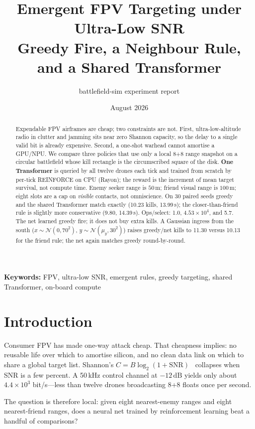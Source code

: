 \documentclass[12pt,a4paper]{article}
\title{\textbf{Emergent FPV Targeting under Ultra-Low SNR}\\[0.35em]
\large Greedy Fire, a Neighbour Rule, and a Shared Transformer}
\author{battlefield-sim experiment report}
\date{August 2026}
\begin{document}
\maketitle

\begin{abstract}
Expendable FPV airframes are cheap; two constraints are not. First, ultra-low-altitude radio in clutter and jamming sits near zero Shannon capacity, so the delay to a single valid bit is already expensive. Second, a one-shot warhead cannot amortise a GPU/NPU. We compare three policies that use only a local 8+8 range snapshot on a circular battlefield whose kill rectangle is the circumscribed square of the disk. \textbf{One Transformer} is queried by all twelve drones each tick and trained from scratch by per-tick REINFORCE on CPU (Rayon); the reward is the increment of mean target survival, not compute time. Enemy seeker range is $50\,\mathrm{m}$; friend visual range is $100\,\mathrm{m}$; eight slots are a cap on \emph{visible} contacts, not omniscience. On 30 paired seeds greedy and the shared Transformer match exactly (10.23 kills, 13.99\,s); the closer-than-friend rule is slightly more conservative (9.80, 14.39\,s). Ops/select: 1.0, $4.53\times 10^4$, and 5.7. The net learned greedy fire; it does not buy extra kills. A Gaussian ingress from the south ($x\sim\mathcal N(0,70^2)$, $y\sim\mathcal N(\mu_y,30^2)$) raises greedy/net kills to 11.30 versus 10.13 for the friend rule; the net again matches greedy round-by-round.
\end{abstract}

\noindent\textbf{Keywords:} FPV, ultra-low SNR, emergent rules, greedy targeting, shared Transformer, on-board compute

\section{Introduction}

Consumer FPV has made one-way attack cheap. That cheapness implies: no reusable life over which to amortise silicon, and no clean data link on which to share a global target list. Shannon's $C=B\log_2(1+\mathrm{SNR})$~\cite{shannon1948,sklar2001} collapses when SNR is a few percent. A 50\,kHz control channel at $-12\,\mathrm{dB}$ yields only about $4.4\times 10^3$ bit/s---less than twelve drones broadcasting 8+8 floats once per second.

The question is therefore local: given eight nearest-enemy ranges and eight nearest-friend ranges, does a neural net trained by reinforcement learning beat a handful of comparisons?
\end{document}
